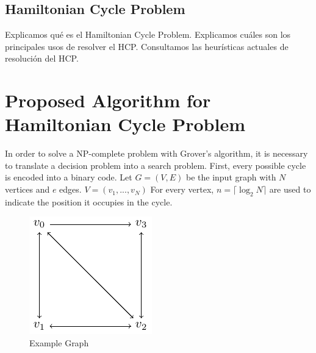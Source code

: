 \documentclass[10pt,a4paper]{article}
\begin{document}
\subsection{Hamiltonian Cycle Problem}
Explicamos qué es el Hamiltonian Cycle Problem.
Explicamos cuáles son los principales usos de resolver el HCP.
Consultamos las heurísticas actuales de resolución del HCP.

\section{Proposed Algorithm for Hamiltonian Cycle Problem}
In order to solve a NP-complete problem with Grover's algorithm, it is necessary to translate a decision problem into a search problem. First, every possible cycle is encoded into a binary code. Let $G=(V, E)$ be the input graph with $N$ vertices and $e$ edges. $V = (v_1, ..., v_N)$ For every vertex, $n = \lceil \log_2 N \rceil$ are used to indicate the position it occupies in the cycle.\\
\begin{figure}[hbtp]
\centering
\includegraphics[scale=1]{figures/ExampleGraph.pdf}
\caption{Example Graph}
\end{figure}
\end{document}
